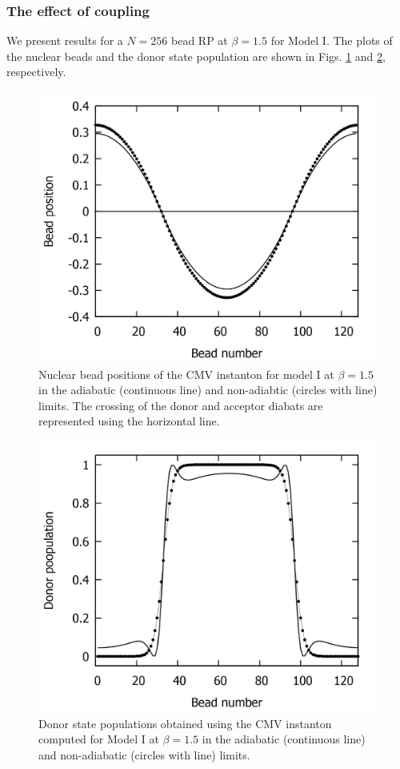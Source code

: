 \documentclass[%
 aip,
 jmp,%
 amsmath,amssymb,
reprint,%
]{revtex4-1}
\begin{document}
\subsubsection{\label{sssec:level5A1} The effect of coupling}
We present results for a $N=256$ bead RP at $\beta=1.5$ for Model I.  The plots of the nuclear beads and the donor state population are shown in Figs. \ref{fig:NAAIns} and \ref{fig:NAAPop}, respectively. 
\begin{figure}[ht!]
\centering
\includegraphics[scale=0.16]{MV-Adia-Non-adia-Ins-b15-symm.png}
\caption{Nuclear bead positions of the CMV instanton for model I at $\beta=1.5$ in the adiabatic (continuous line) and non-adiabtic (circles with line) limits. The crossing of the donor and acceptor diabats are represented using the horizontal line.} \label{fig:NAAIns}
\end{figure}
\begin{figure}[ht!]
\centering
\includegraphics[scale=0.16]{MV-Adia-Non-adia-Pop-b15-symm.png}
\caption{Donor state populations obtained using the CMV instanton computed for Model I at $\beta=1.5$ in the adiabatic (continuous line) and non-adiabatic (circles with line) limits. } \label{fig:NAAPop}
\end{figure}
\end{document}
